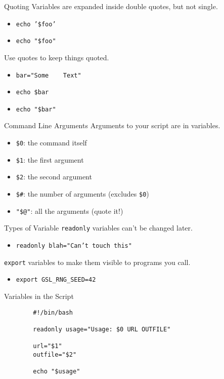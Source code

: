 \documentclass[pdf,usenames,dvipsnames,14pt]{beamer}%
\begin{document}
\begin{frame}{Quoting}
	Variables are expanded inside double quotes, but not single.
	\begin{itemize}
		\item \texttt{echo '\$foo'}
		\item \texttt{echo "\$foo"}
	\end{itemize}
	Use quotes to keep things quoted.
	\begin{itemize}
		\item \texttt{bar="Some\ \ \ \ Text"}
		\item \texttt{echo \$bar}
		\item \texttt{echo "\$bar"}
	\end{itemize}
\end{frame}

\begin{frame}{Command Line Arguments}
	Arguments to your script are in variables.
	\begin{itemize}
		\item \texttt{\$0}: the command itself
		\item \texttt{\$1}: the first argument
		\item \texttt{\$2}: the second argument
		\item \texttt{\$\#}: the number of arguments (excludes \texttt{\$0})
		\item \texttt{"\$@"}: all the arguments (quote it!)
	\end{itemize}
\end{frame}

\begin{frame}{Types of Variable}
	\texttt{readonly} variables can't be changed later.
	\begin{itemize}
		\item \texttt{readonly blah="Can't touch this"}
	\end{itemize}
	\texttt{export} variables to make them visible to programs you call.
	\begin{itemize}
		\item \texttt{export GSL\_RNG\_SEED=42}
	\end{itemize}
\end{frame}

\begin{frame}[fragile]{Variables in the Script}
	\begin{verbatim}
		#!/bin/bash
		
		readonly usage="Usage: $0 URL OUTFILE"
		
		url="$1"
		outfile="$2"
		
		echo "$usage"
	\end{verbatim}
\end{frame}
\end{document}
